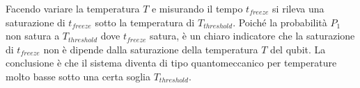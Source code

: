 Facendo variare la temperatura $T$ e misurando il tempo $t_{freeze}$ si rileva una saturazione di $t_{freeze}$ sotto la temperatura di $T_{threshold}$. Poiché la probabilità $P_1$ non satura a $T_{threshold}$ dove $t_{freeze}$ satura, è un chiaro indicatore che la saturazione di $t_{freeze}$ non è dipende dalla saturazione della temperatura $T$ del qubit. La conclusione è che il sistema diventa di tipo quantomeccanico per temperature molto basse sotto una certa soglia $T_{threshold}$.

